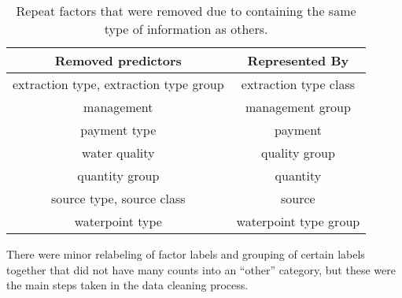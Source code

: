 \begin{table}[h]
\center
\caption{Repeat factors that were removed due to containing the same type of information as others.}
\begin{tabular}{|c|c|}
\hline
     Removed predictors & Represented By \\
     \hline
     
extraction type, extraction type group   &  extraction type class \\
management  & management group \\
payment type    & payment   \\
water quality   & quality group   \\
quantity group     & quantity    \\
source type, source class  & source \\
waterpoint type   & waterpoint type group \\
\hline
\end{tabular}
\label{tab:repeatFactors}
\end{table}

There were minor relabeling of factor labels and grouping of certain labels together that did not have many counts into an ``other'' category, but these were the main steps taken in the data cleaning process.
